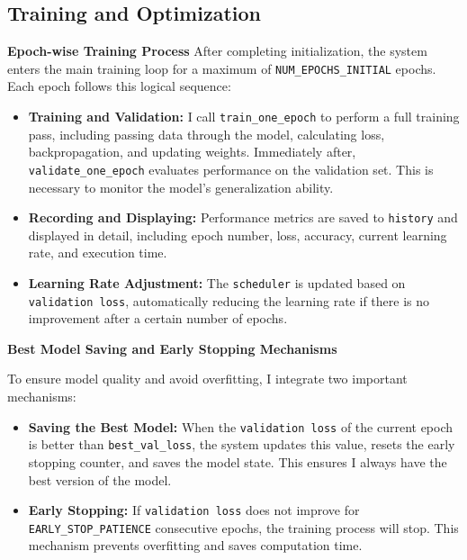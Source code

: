 \documentclass[12pt, a4paper, openany]{report}
\begin{document}
 \subsection{Training and Optimization} %
 \textbf{Epoch-wise Training Process} %
 After completing initialization, the system enters the main training loop for a maximum of \texttt{NUM\_EPOCHS\_INITIAL} epochs. Each epoch follows this logical sequence:
 \begin{itemize}
     \item \textbf{Training and Validation:} I call \texttt{train\_one\_epoch} to perform a full training pass, including passing data through the model, calculating loss, backpropagation, and updating weights. Immediately after, \texttt{validate\_one\_epoch} evaluates performance on the validation set. This is necessary to monitor the model's generalization ability. %
     \item \textbf{Recording and Displaying:} Performance metrics are saved to \texttt{history} and displayed in detail, including epoch number, loss, accuracy, current learning rate, and execution time. %
     \item \textbf{Learning Rate Adjustment:} The \texttt{scheduler} is updated based on \texttt{validation loss}, automatically reducing the learning rate if there is no improvement after a certain number of epochs. %
 \end{itemize}

 \textbf{Best Model Saving and Early Stopping Mechanisms} %

 To ensure model quality and avoid overfitting, I integrate two important mechanisms:
 \begin{itemize}
     \item \textbf{Saving the Best Model:} When the \texttt{validation loss} of the current epoch is better than \texttt{best\_val\_loss}, the system updates this value, resets the early stopping counter, and saves the model state. This ensures I always have the best version of the model. %
     \item \textbf{Early Stopping:} If \texttt{validation loss} does not improve for \texttt{EARLY\_STOP\_PATIENCE} consecutive epochs, the training process will stop. This mechanism prevents overfitting and saves computation time. %
 \end{itemize}
\end{document}
